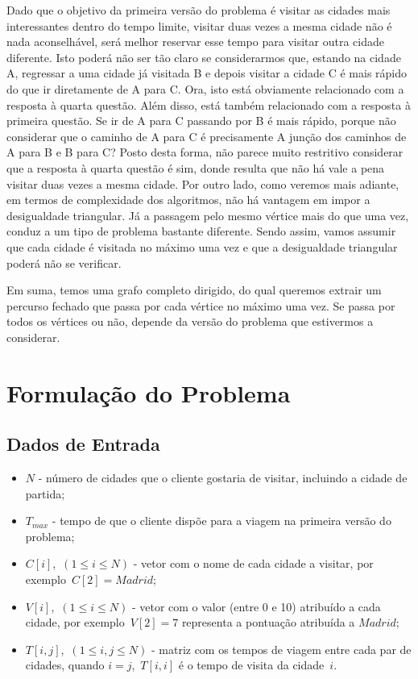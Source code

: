 \documentclass[12pt,a4paper,reqno]{report}
\numberwithin{figure}{section}
\numberwithin{equation}{section}
\begin{document}
Dado que o objetivo da primeira versão do problema é visitar as cidades mais interessantes dentro do tempo limite, visitar duas vezes a mesma cidade não é nada aconselhável, será melhor reservar esse tempo para visitar outra cidade diferente. Isto poderá não ser tão claro se considerarmos que, estando na cidade A, regressar a uma cidade já visitada B e depois visitar a cidade C é mais rápido do que ir diretamente de A para C. Ora, isto está obviamente relacionado com a resposta à quarta questão. Além disso, está também relacionado com a resposta à primeira questão. Se ir de A para C passando por B é mais rápido, porque não considerar que o caminho de A para C é precisamente A junção dos caminhos de A para B e B para C? Posto desta forma, não parece muito restritivo considerar que a resposta à quarta questão é sim, donde resulta que não há vale a pena visitar duas vezes a mesma cidade. Por outro lado, como veremos mais adiante, em termos de complexidade dos algoritmos, não há vantagem em impor a desigualdade triangular. Já a passagem pelo mesmo vértice mais do que uma vez, conduz a um tipo de problema bastante diferente. Sendo assim, vamos assumir que cada cidade é visitada no máximo uma vez e que a desigualdade triangular poderá não se verificar.

Em suma, temos uma grafo completo dirigido, do qual queremos extrair um percurso fechado que passa por cada vértice no máximo uma vez. Se passa por todos os vértices ou não, depende da versão do problema que estivermos a considerar.

\chapter{Formulação do Problema}

\section{Dados de Entrada}

\begin{itemize}
	\item $N$ - número de cidades que o cliente gostaria de visitar, incluindo a cidade de partida;
	\item $T_{max}$ - tempo de que o cliente dispõe para a viagem na primeira versão do problema;
	\item $C[i]$,~$(1 \leq i \leq N)$ - vetor com o nome de cada cidade a visitar, por exemplo~$C[2] = Madrid$;
	\item $V[i]$,~$(1 \leq i \leq N)$ - vetor com o valor (entre 0 e 10) atribuído a cada cidade, por exemplo~$V[2] = 7$ representa a pontuação atribuída a $Madrid$;
	\item $T[i,j]$,~$(1 \leq i,j \leq N)$ - matriz com os tempos de viagem entre cada par de cidades, quando $i = j$,~$T[i,i]$ é o tempo de visita da cidade~$i$.
\end{itemize}
\end{document}
